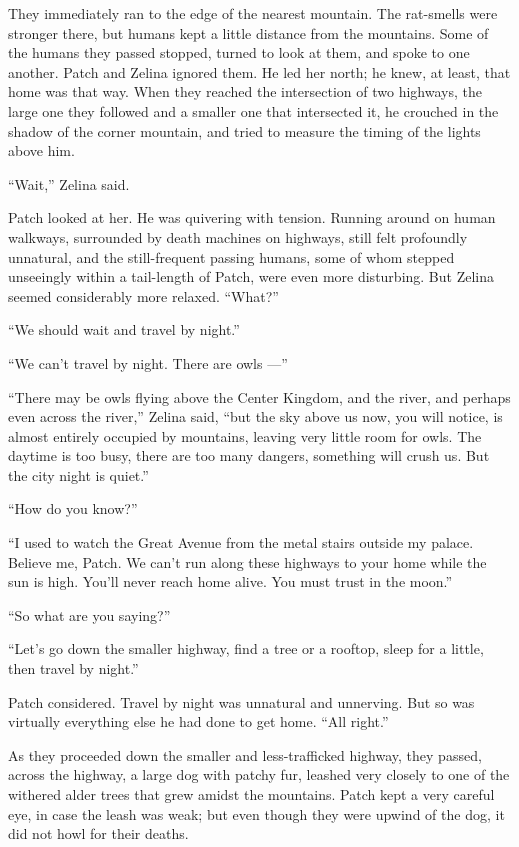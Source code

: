 \documentclass[ebook,oneside,openany,17pt]{memoir}
\begin{document}
They immediately ran to the edge of the nearest mountain. The
rat-smells were stronger there, but humans kept a little distance from
the mountains. Some of the humans they passed stopped, turned to look
at them, and spoke to one another. Patch and Zelina ignored them. He
led her north; he knew, at least, that home was that way. When they
reached the intersection of two highways, the large one they followed
and a smaller one that intersected it, he crouched in the shadow of
the corner mountain, and tried to measure the timing of the lights
above him.

“Wait,” Zelina said.

Patch looked at her. He was quivering with tension. Running around on
human walkways, surrounded by death machines on highways, still felt
profoundly unnatural, and the still-frequent passing humans, some of
whom stepped unseeingly within a tail-length of Patch, were even more
disturbing. But Zelina seemed considerably more relaxed. “What?”

“We should wait and travel by night.”

“We can’t travel by night. There are owls —”

“There may be owls flying above the Center Kingdom, and the river, and
perhaps even across the river,” Zelina said, “but the sky above us
now, you will notice, is almost entirely occupied by mountains,
leaving very little room for owls. The daytime is too busy, there are
too many dangers, something will crush us. But the city night is
quiet.”

“How do you know?”

“I used to watch the Great Avenue from the metal stairs outside my
palace. Believe me, Patch. We can’t run along these highways to your
home while the sun is high. You’ll never reach home alive. You must
trust in the moon.”

“So what are you saying?”

“Let’s go down the smaller highway, find a tree or a rooftop, sleep
for a little, then travel by night.”

Patch considered. Travel by night was unnatural and unnerving. But so
was virtually everything else he had done to get home. “All right.”

As they proceeded down the smaller and less-trafficked highway, they
passed, across the highway, a large dog with patchy fur, leashed very
closely to one of the withered alder trees that grew amidst the
mountains. Patch kept a very careful eye, in case the leash was weak;
but even though they were upwind of the dog, it did not howl for their
deaths.
\end{document}

